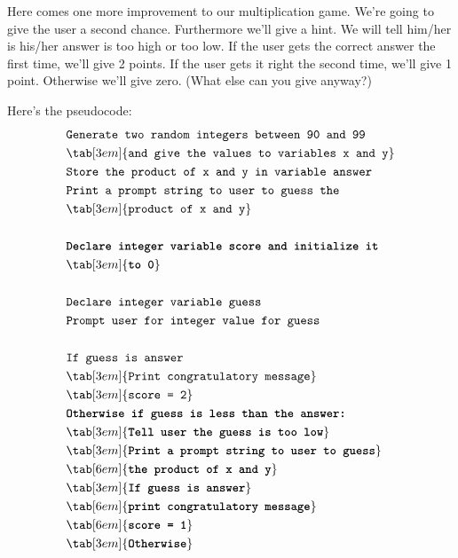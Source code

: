 
\newpage{}

Here comes one more improvement to our multiplication game. We're going to give the user a second chance. Furthermore we'll give a hint. We will tell him/her is his/her answer is too high or too low. If the user gets the correct answer the first time, we'll give 2 points. If the user gets it right the second time, we'll give 1 point. Otherwise we'll give zero. (What else can you give anyway?)

Here's the pseudocode:
\begin{align*}
&\texttt{Generate two random integers between 90 and 99}\\
&\tab[3em]{\texttt{and give the values to variables x and y}}\\
&\texttt{Store the product of x and y in variable answer}\\
&\texttt{Print a prompt string to user to guess the}\\
&\tab[3em]{\texttt{product of x and y}}\\\\
&\texttt{\textbf{Declare integer variable score and initialize it}}\\
&\tab[3em]{\textbf{\texttt{to 0}}}\\\\
&\texttt{Declare integer variable guess}\\
&\texttt{Prompt user for integer value for guess}\\\\
&\texttt{If guess is answer}\\
&\tab[3em]{\texttt{Print congratulatory message}}\\
&\tab[3em]{\texttt{score = 2}}\\
&\textbf{\texttt{Otherwise if guess is less than the answer:}}\\
&\tab[3em]{\textbf{\texttt{Tell user the guess is too low}}}\\
&\tab[3em]{\textbf{\texttt{Print a prompt string to user to guess}}}\\
&\tab[6em]{\textbf{\texttt{the product of x and y}}}\\
&\tab[3em]{\textbf{\texttt{If guess is answer}}}\\
&\tab[6em]{\textbf{\texttt{print congratulatory message}}}\\
&\tab[6em]{\textbf{\texttt{score = 1}}}\\
&\tab[3em]{\textbf{\texttt{Otherwise}}}\\

\end{align*}

